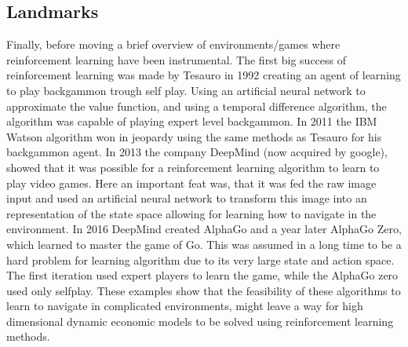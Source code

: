 \subsection{Landmarks}

Finally, before moving a brief overview of environments/games where reinforcement learning have been instrumental. The first big success of reinforcement learning was made by Tesauro in 1992 creating an agent of learning to play backgammon trough self play. Using an artificial neural network to approximate the value function, and using a temporal difference algorithm, the algorithm was capable of playing expert level backgammon. In 2011 the IBM Watson algorithm won in jeopardy using the same methods as Tesauro for his backgammon agent. In 2013 the company DeepMind (now acquired by google), showed that it was possible for a reinforcement learning algorithm to learn to play video games. Here an important feat was, that it was fed the raw image input and used an artificial neural network to transform this image into an representation of the state space allowing for learning how to navigate in the environment. In 2016 DeepMind created AlphaGo and a year later AlphaGo Zero, which learned to master the game of Go. This was assumed in a long time to be a hard problem for learning algorithm due to its very large state and action space. The first iteration used expert players to learn the game, while the AlphaGo zero used only selfplay. These examples show that the feasibility of these algorithms to learn to navigate in complicated environments, might leave a way for high dimensional dynamic economic models to be solved using reinforcement learning methods.